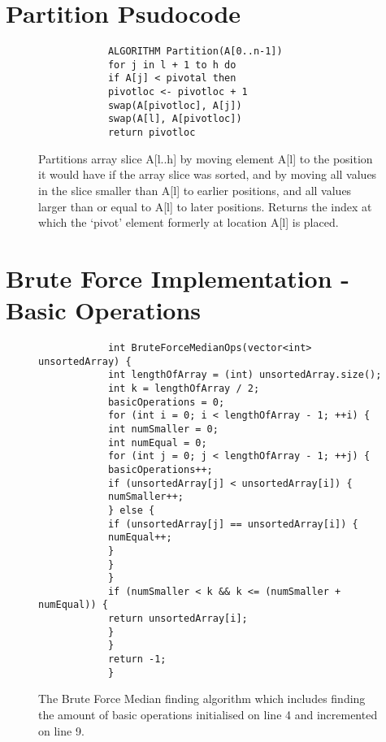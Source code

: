 \documentclass[a4paper,12pt]{article} %
\begin{document}
\begin{appendices}
		\section{Partition Psudocode}
		\begin{figure}[h]
			\begin{lstlisting}
			ALGORITHM Partition(A[0..n-1])
			for j in l + 1 to h do
			if A[j] < pivotal then
			pivotloc <- pivotloc + 1
			swap(A[pivotloc], A[j])
			swap(A[l], A[pivotloc])
			return pivotloc
			\end{lstlisting}
			\caption{\label{PartitionPsudocode} Partitions array slice A[l..h] by moving element A[l] to the position it would have if the array slice was sorted, and by moving all values in the slice smaller than A[l] to earlier positions, and all values larger than or equal to A[l] to later positions. Returns the index at which  the ‘pivot’ element formerly at location A[l] is placed.} 
		\end{figure}
		
		\newpage
		
		\section{Brute Force Implementation - Basic Operations}
		\begin{figure}[H]
			\begin{lstlisting}
			int BruteForceMedianOps(vector<int> unsortedArray) {
			int lengthOfArray = (int) unsortedArray.size();
			int k = lengthOfArray / 2;
			basicOperations = 0;
			for (int i = 0; i < lengthOfArray - 1; ++i) {
			int numSmaller = 0;
			int numEqual = 0;
			for (int j = 0; j < lengthOfArray - 1; ++j) {
			basicOperations++;
			if (unsortedArray[j] < unsortedArray[i]) {
			numSmaller++;
			} else {
			if (unsortedArray[j] == unsortedArray[i]) {
			numEqual++;
			}
			}
			}
			if (numSmaller < k && k <= (numSmaller + numEqual)) {
			return unsortedArray[i];
			}
			}
			return -1;
			}
			\end{lstlisting}
			\caption{\label{BruteForceImplementationOps} The Brute Force Median finding algorithm which includes finding the amount of basic operations initialised on line 4 and incremented on line 9.}
		\end{figure}
		
		\newpage
		

\end{appendices}
\end{document}
